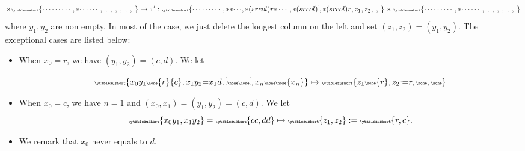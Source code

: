 \documentclass[12pt,a4paper]{amsart}
\numberwithin{equation}{section}
\theoremstyle{remark}
\let\ytb=\ytableaushort
\newcommand{\tytb}[1]{{\tiny\ytb{#1}}}
\begin{document}
\begin{enumerate}[resume*=alg1]
\[        \times\tytb{{\cdots}\cdots\cdots,{\ast}{\cdots}\cdots,\ ,\ ,\ ,\ ,\ ,\ ,\ }
        \mapsto \uptau':
        \tytb{\cdots\cdots\cdots,{\ast}{\ast}{\cdots},{*(srcol)r}{\ast}\cdots,{*(srcol)\vdots},{*(srcol)r},{z_{1}},{z_{2}},\ ,\ }
        \times\tytb{{\cdots}\cdots\cdots,{\ast}{\cdots}\cdots,\ ,\ ,\ ,\ ,\ ,\ ,\ }
        \]
      where $y_{1},y_{2}$ are non empty.
      In most of the case, we just delete the longest column on the left and set
      $(z_{1},z_{2})=(y_{1},y_{2})$. The exceptional cases are listed below:
      \begin{itemize}
        \item When
 $x_{0}=r$, we have $(y_{1},y_{2})=(c,d)$. We let
      \[
          \tytb{{x_{0}}{y_{1}}\none{r}{c},{x_{1}}{y_{2}}{=}{x_{1}}{d},\vdots\none\none\vdots,{x_{n}}\none\none{x_{n}}}
          \mapsto \tytb{{z_{1}}\none{r},{z_{2}}{:=}r,\none,\none}
        \]

        \item When $x_{0}=c$, we have $n=1$ and $(x_{0},x_{1})=(y_{1},y_{2})=(c,d)$. We let
        \[
          \tytb{{x_{0}}{y_{1}},{x_{1}}{y_{2}}} = \tytb{cc,dd}
          \mapsto \tytb{{z_{1}},{z_{2}}}:=\tytb{r,c}.
      \]
      \item
      We remark that $x_{0}$ never equals to $d$.
  \end{itemize}
\end{enumerate}
\end{document}
